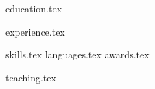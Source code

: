 \documentclass[letterpaper,11pt]{article}
\begin{document}


{education.tex}

{experience.tex}

\sidebyside
    {{skills.tex}}
    {{languages.tex}}
{awards.tex}

{teaching.tex}
\end{document}
